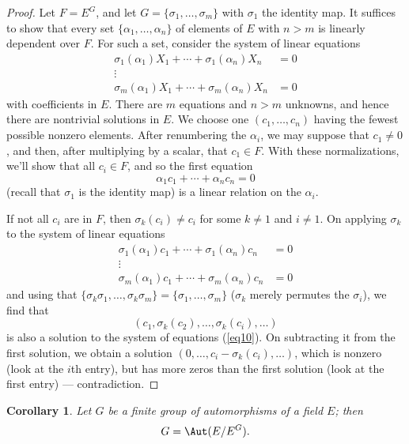 \documentclass[a4paper,11pt,final,openany]{memoir}
\newtheorem{corollary}[X]{Corollary}
\theoremstyle{nonumberplain}
\newtheorem{proof}{Proof.}
\begin{document}
\begin{proof}
Let $F=E^{G}$, and let $G=\{\sigma_{1},\ldots,\sigma_{m}\}$ with $\sigma_{1}$
the identity map. It suffices to show that every set $\{\alpha_{1}%
,\ldots,\alpha_{n}\}$ of elements of $E$ with $n>m$ is linearly dependent over
$F$. For such a set, consider the system of linear equations%
\begin{align}
\sigma_{1}(\alpha_{1})X_{1}+\cdots+\sigma_{1}(\alpha_{n})X_{n}  &
=0\nonumber\\
\vdots\qquad\qquad & \label{eq10}\\
\sigma_{m}(\alpha_{1})X_{1}+\cdots+\sigma_{m}(\alpha_{n})X_{n}  &  =0\nonumber
\end{align}
with coefficients in $E$. There are $m$ equations and $n>m$ unknowns, and
hence there are nontrivial solutions in $E$. We choose one $(c_{1}%
,\ldots,c_{n})$ having the fewest possible nonzero elements. After renumbering
the $\alpha_{i}$, we may suppose that $c_{1}\neq0$, and then, after
multiplying by a scalar, that $c_{1}\in F$. With these normalizations, we'll
show that all $c_{i}\in F$, and so the first equation
\[
\alpha_{1}c_{1}+\cdots+\alpha_{n}c_{n}=0
\]
(recall that $\sigma_{1}$ is the identity map) is a linear relation on the
$\alpha_{i}$.

If not all $c_{i}$ are in $F$, then $\sigma_{k}(c_{i})\neq c_{i}$ for some
$k\neq1$ and $i\neq1$. On applying $\sigma_{k}$ to the system of linear
equations
\begin{align*}
\sigma_{1}(\alpha_{1})c_{1}+\cdots+\sigma_{1}(\alpha_{n})c_{n}  &  =0\\
\vdots\qquad\qquad & \\
\sigma_{m}(\alpha_{1})c_{1}+\cdots+\sigma_{m}(\alpha_{n})c_{n}  &  =0
\end{align*}
and using that $\{\sigma_{k}\sigma_{1},\ldots,\sigma_{k}\sigma_{m}%
\}=\{\sigma_{1},\ldots,\sigma_{m}\}$ ($\sigma_{k}$ merely permutes the
$\sigma_{i}$), we find that
\[
(c_{1},\sigma_{k}(c_{2}),\ldots,\sigma_{k}(c_{i}),\ldots)
\]
is also a solution to the system of equations (\ref{eq10}). On subtracting it
from the first solution, we obtain a solution $(0,\ldots,c_{i}-\sigma
_{k}(c_{i}),\ldots)$, which is nonzero (look at the $i$th entry), but has more
zeros than the first solution (look at the first entry) --- contradiction.
\end{proof}

\begin{corollary}
\label{ft10d}Let $G$ be a finite group of automorphisms of a field $E$; then
\[
G=\Aut(E/E^{G}).
\]

\end{corollary}
\end{document}
